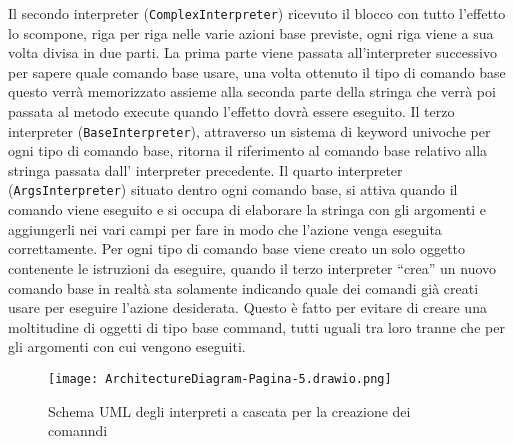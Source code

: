 Il secondo interpreter (\texttt{ComplexInterpreter}) ricevuto il blocco con tutto l’effetto lo scompone, riga per riga nelle varie azioni base previste, ogni riga viene a sua volta divisa in due parti. 
La prima parte viene passata all’interpreter successivo per sapere quale comando base usare, una volta ottenuto il tipo di comando base questo verrà memorizzato assieme alla seconda parte della stringa che verrà poi passata al metodo execute quando l’effetto dovrà essere eseguito.  
Il terzo interpreter (\texttt{BaseInterpreter}), attraverso un sistema di keyword univoche per ogni tipo di comando base, ritorna il riferimento al comando base relativo alla stringa passata dall’ interpreter precedente.
Il quarto interpreter (\texttt{ArgsInterpreter}) situato dentro ogni comando base, si attiva quando il comando viene eseguito e si occupa di elaborare la stringa con gli argomenti e aggiungerli nei vari campi per fare in modo che l’azione venga eseguita correttamente.
Per ogni tipo di comando base viene creato un solo oggetto contenente le istruzioni da eseguire, quando il terzo interpreter “crea” un nuovo comando base in realtà sta solamente indicando quale dei comandi già creati usare per eseguire l’azione desiderata.
Questo è fatto per evitare di creare una moltitudine di oggetti di tipo base command, tutti uguali tra loro tranne che per gli argomenti con cui vengono eseguiti.
\begin{figure}[h]
    \centering
    \texttt{[image: ArchitectureDiagram-Pagina-5.drawio.png]}
    \caption{Schema UML degli interpreti a cascata per la creazione dei comanndi}
    \label{img:ArchitectureDiagram-Pagina-5}
\end{figure}
